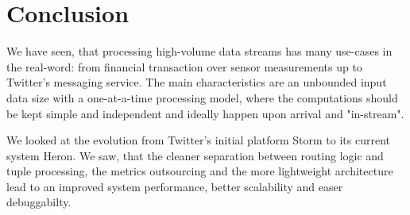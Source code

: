 \documentclass[conference]{IEEEtran}
\begin{document}
\section{Conclusion}
\label{sec:Conclusion}

We have seen, that processing high-volume data streams has many use-cases in the real-word: from financial transaction over sensor measurements up to Twitter's messaging service.
The main characteristics are an unbounded input data size with a one-at-a-time processing model, where the computations should be kept simple and independent and ideally happen upon arrival and "in-stream".

We looked at the evolution from Twitter's initial platform Storm to its current system Heron.
We saw, that the cleaner separation between routing logic and tuple processing, the metrics outsourcing and the more lightweight architecture lead to an improved system performance, better scalability and easer debuggabilty.



\end{document}

